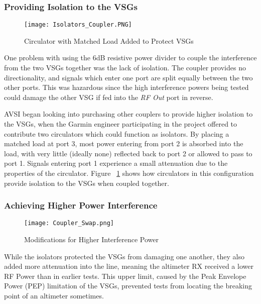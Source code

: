 \subsubsection{Providing Isolation to the VSGs}
\begin{figure}[ht]
\centering
\texttt{[image: Isolators\_Coupler.PNG]}
\caption[]{Circulator with Matched Load Added to Protect VSGs}

\label{fig:circulator}
\end{figure}
One problem with using the 6dB resistive power divider to couple the interference from the two VSGs together was the lack of isolation. The coupler provides no directionality, and signals which enter one port are split equally between the two other ports. This was hazardous since the high interference powers being tested could damage the other VSG if fed into the \textit{RF Out} port in reverse. 

AVSI began looking into purchasing other couplers to provide higher isolation to the VSGs, when the Garmin engineer participating in the project offered to contribute two circulators which could function as isolators. By placing a matched load at port 3, most power entering from port 2 is absorbed into the load, with very little (ideally none) reflected back to port 2 or allowed to pass to port 1. Signals entering port 1 experience a small attenuation due to the properties of the circulator. Figure ~\ref{fig:circulator} shows how circulators in this configuration provide isolation to the VSGs when coupled together. 

\subsubsection{Achieving Higher Power Interference}

\begin{figure}[ht]
\centering
\texttt{[image: Coupler\_Swap.png]}
\caption[]{Modifications for Higher Interference Power}

\label{fig:coupler_swap}

\end{figure}


While the isolators protected the VSGs from damaging one another, they also added more attenuation into the line, meaning the altimeter RX received a lower RF Power than in earlier tests. This upper limit, caused by the Peak Envelope Power (PEP) limitation of the VSGs, prevented tests from locating the breaking point of an altimeter sometimes. 


